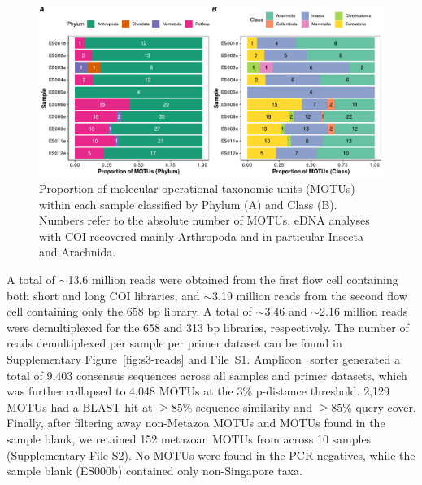 \begin{figure}[tb]
    \centering
    \includegraphics[width=\linewidth]{chapters/papers/EP/figures/05_motus.pdf}
    \caption{Proportion of molecular operational taxonomic units (MOTUs) within each sample classified by Phylum (A) and Class (B). Numbers refer to the absolute number of \glspl{MOTU}. \gls{eDNA} analyses with COI recovered mainly Arthropoda and in particular Insecta and Arachnida.}
    \label{fig:5-barplot}
\end{figure}

A total of $\sim$13.6 million reads were obtained from the first flow cell containing both short and long COI libraries, and $\sim$3.19 million reads from the second flow cell containing only the 658 bp library. A total of $\sim$3.46 and $\sim$2.16 million reads were demultiplexed for the 658 and 313 bp libraries, respectively. The number of reads demultiplexed per sample per primer dataset can be found in Supplementary Figure~\ref{fig:s3-reads} and File~S1. Amplicon\_sorter generated a total of 9,403 consensus sequences across all samples and primer datasets, which was further collapsed to 4,048 \glspl{MOTU} at the 3\% p-distance threshold. 2,129 \glspl{MOTU} had a BLAST hit at $\geq 85 \%$ sequence similarity and $\geq 85 \%$ query cover. Finally, after filtering away non-Metazoa \glspl{MOTU} and \glspl{MOTU} found in the sample blank, we retained 152 metazoan \glspl{MOTU} from across 10 samples (Supplementary File S2). No \glspl{MOTU} were found in the PCR negatives, while the sample blank (ES000b) contained only non-Singapore taxa.

